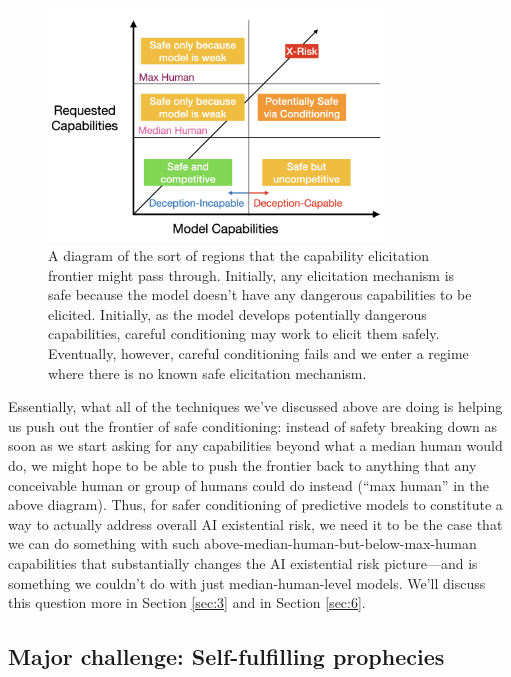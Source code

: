 \documentclass[
  onecolumn,
  nonatbib,
]{miri-tech-article}
\begin{document}
\begin{figure}[h!]
  \centering
  \includegraphics[width=0.8\textwidth]{n3TBfx6.png}
  \caption{A diagram of the sort of regions that the capability elicitation frontier might pass through. Initially, any elicitation mechanism is safe because the model doesn't have any dangerous capabilities to be elicited. Initially, as the model develops potentially dangerous capabilities, careful conditioning may work to elicit them safely. Eventually, however, careful conditioning fails and we enter a regime where there is no known safe elicitation mechanism.}
\end{figure}

Essentially, what all of the techniques we've discussed above are doing is helping us push out the frontier of safe conditioning: instead of safety breaking down as soon as we start asking for any capabilities beyond what a median human would do, we might hope to be able to push the frontier back to anything that any conceivable human or group of humans could do instead (``max human'' in the above diagram). Thus, for safer conditioning of predictive models to constitute a way to actually address overall AI existential risk, we need it to be the case that we can do something with such above-median-human-but-below-max-human capabilities that substantially changes the AI existential risk picture---and is something we couldn't do with just median-human-level models. We'll discuss this question more in Section \ref{sec:3} and in Section \ref{sec:6}.


\subsection{Major challenge: Self-fulfilling prophecies}
\label{sec:2d}
\end{document}
